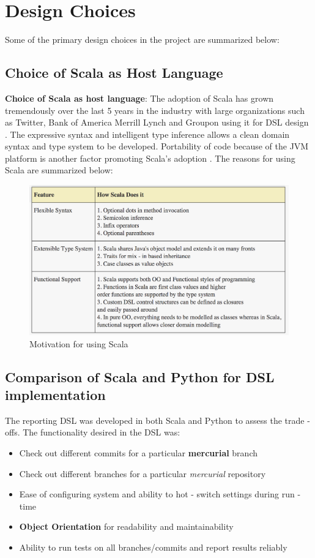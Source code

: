 \section{Design Choices}

Some of the primary design choices in the project are summarized below:

\subsection{Choice of Scala as Host Language}
\textbf{Choice of Scala as host language}: The adoption of Scala has grown tremendously over the last 5 years in the industry with large organizations such as Twitter, Bank of America Merrill Lynch and Groupon using it for DSL design \cite{scala}. The expressive syntax and intelligent type inference allows a clean domain syntax and type system to be developed. Portability of code because of the JVM platform is another factor promoting Scala's adoption \cite{scala}. The reasons for using Scala are summarized below:

\begin{figure}[H]
  \centering
    \includegraphics[width=500px]{figures/scala_motivation.png}
  \caption{Motivation for using Scala}
\end{figure}

\subsection{Comparison of Scala and Python for DSL implementation}

The reporting DSL was developed in both Scala and Python to assess the trade - offs. The functionality desired in the DSL was:
\begin{itemize}
\item Check out different commits for a particular \textbf{mercurial} branch
\item Check out different branches for a particular \textit{mercurial} repository
\item Ease of configuring system and ability to hot - switch settings during run - time
\item \textbf{Object Orientation} for readability and maintainability
\item Ability to run tests on all branches/commits and report results reliably
\end{itemize}


